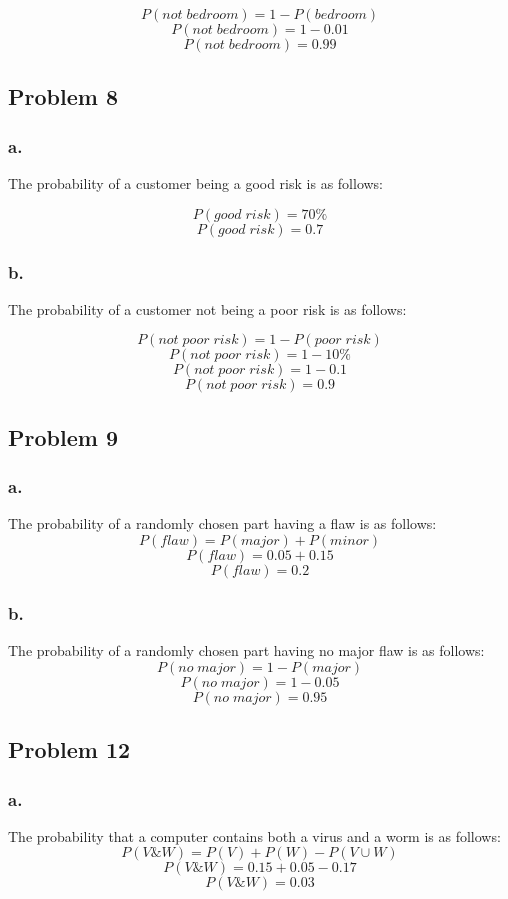 \documentclass[11pt]{article}
\begin{document}
\[ P(not\;bedroom) = 1 - P(bedroom) \]
\[ P(not\;bedroom) = 1 - 0.01 \]
\[ P(not\;bedroom) = 0.99 \]

\subsection*{Problem 8}
\subsubsection*{a.}
The probability of a customer being a good risk is as follows:

\[ P(good\;risk) = 70\% \]
\[ P(good\;risk) = 0.7 \]

\subsubsection*{b.}
The probability of a customer not being a poor risk is as follows:

\[ P(not\;poor\;risk) = 1 - P(poor\;risk) \]
\[ P(not\;poor\;risk) = 1 - 10\% \]
\[ P(not\;poor\;risk) = 1 - 0.1 \]
\[ P(not\;poor\;risk) = 0.9 \]

\subsection*{Problem 9}
\subsubsection*{a.}
The probability of a randomly chosen part having a flaw is as follows:
\[ P(flaw) = P(major) + P(minor) \]
\[ P(flaw) = 0.05 + 0.15 \]
\[ P(flaw) = 0.2 \]

\subsubsection*{b.}
The probability of a randomly chosen part having no major flaw is as follows:
\[ P(no\;major) = 1 - P(major) \]
\[ P(no\;major) = 1 - 0.05 \]
\[ P(no\;major) = 0.95 \]

\subsection*{Problem 12}
\subsubsection*{a.}
The probability that a computer contains both a virus and a worm is as follows:
\[ P(V\&W) = P(V) + P(W) - P(V\cup W) \]
\[ P(V\&W) = 0.15 + 0.05 - 0.17 \]
\[ P(V\&W) = 0.03 \]
\end{document}
